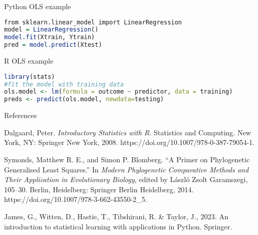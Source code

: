 \begin{algorithm}
    \caption{Python OLS example}\label{alg:ols_py}
\begin{lstlisting}[language=R]
from sklearn.linear_model import LinearRegression
model = LinearRegression()
model.fit(Xtrain, Ytrain)
pred = model.predict(Xtest)
\end{lstlisting}
\end{algorithm}

\begin{algorithm}
    \caption{R OLS example}\label{alg:ols_r}
\begin{lstlisting}[language=R]
library(stats)
#fit the model with training data
ols.model <- lm(formula = outcome ~ predictor, data = training)
preds <- predict(ols.model, newdata=testing)
\end{lstlisting}
\end{algorithm}


References

Dalgaard, Peter. \emph{Introductory Statistics with R}. Statistics and
Computing. New York, NY: Springer New York, 2008.
https://doi.org/10.1007/978-0-387-79054-1.

Symonds, Matthew R. E., and Simon P. Blomberg. ``A Primer on
Phylogenetic Generalised Least Squares.'' In \emph{Modern Phylogenetic
Comparative Methods and Their Application in Evolutionary Biology},
edited by László Zsolt Garamszegi, 105--30. Berlin, Heidelberg: Springer
Berlin Heidelberg, 2014. https://doi.org/10.1007/978-3-662-43550-2\_5.

James, G., Witten, D., Hastie, T., Tibshirani, R. \& Taylor, J., 2023.
An introduction to statistical learning with applications in Python.
Springer.
